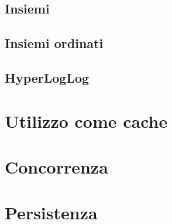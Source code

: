 \subsection{Insiemi}

\subsection{Insiemi ordinati}

\subsection{HyperLogLog}

\section{Utilizzo come cache}

\section{Concorrenza}

\section{Persistenza}








